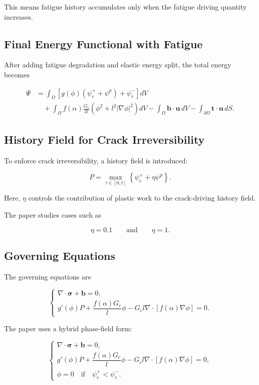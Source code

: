 ﻿\documentclass[11pt,a4paper]{article}
\begin{document}
This means fatigue history accumulates only when the fatigue driving quantity increases.

\subsection{Final Energy Functional with Fatigue}

After adding fatigue degradation and elastic energy split, the total energy becomes

\[
\begin{aligned}
\Psi
&=
\int_{\Omega}
\left[
g(\phi)(\psi_e^+ + \psi^p)
+
\psi_e^-
\right]dV \\
&\quad
+
\int_{\Omega}
f(\alpha)
\frac{G_c}{2l}
\left(
\phi^2+l^2|\nabla \phi|^2
\right)dV
-
\int_{\Omega}
\bm{b}\cdot \bm{u}\,dV
-
\int_{\partial\Omega}
\bm{t}\cdot \bm{u}\,dS.
\end{aligned}
\]

\subsection{History Field for Crack Irreversibility}

To enforce crack irreversibility, a history field is introduced:

\[
P
=
\max_{\tau\in[0,t]}
\left\{
\psi_e^+ + \eta \psi^p
\right\}.
\]

Here, $\eta$ controls the contribution of plastic work to the crack-driving history field.

The paper studies cases such as

\[
\eta = 0.1
\qquad \text{and} \qquad
\eta = 1.
\]

\subsection{Governing Equations}

The governing equations are

\[
\begin{cases}
\nabla\cdot \bm{\sigma} + \bm{b} = 0, \\
g'(\phi)P
+
\dfrac{f(\alpha)G_c}{l}\phi
-
G_c l \nabla\cdot
\left[
f(\alpha)\nabla\phi
\right]
=0.
\end{cases}
\]

The paper uses a hybrid phase-field form:

\[
\begin{cases}
\nabla\cdot \bm{\sigma} + \bm{b} = 0, \\
g'(\phi)P
+
\dfrac{f(\alpha)G_c}{l}\phi
-
G_c l \nabla\cdot
\left[
f(\alpha)\nabla\phi
\right]
=0, \\
\phi = 0
\quad \text{if}
\quad
\psi_e^+ < \psi_e^-.
\end{cases}
\]
\end{document}

